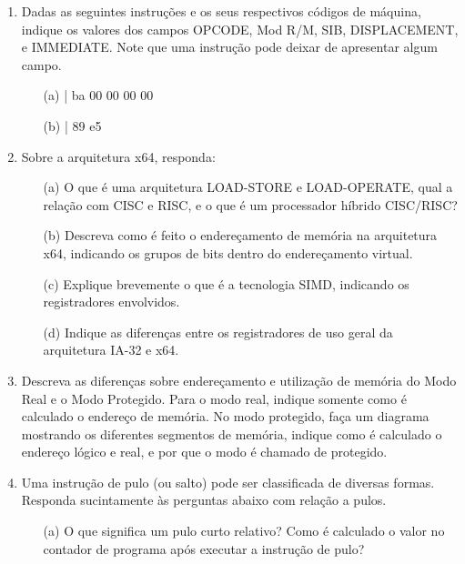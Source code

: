 \begin{enumerate}

    \item 
    Dadas as seguintes instruções e os seus respectivos códigos de máquina,
    indique os valores dos campos OPCODE, Mod R/M, SIB, DISPLACEMENT, e IMMEDIATE.
    Note que uma instrução pode deixar de apresentar algum campo.
    \begin{itemize}
        \item [(a)]  | ba 00 00 00 00
        \item [(b)]  | 89 e5
    \end{itemize}

    \item
    Sobre a arquitetura x64, responda:
    \begin{itemize}
        \item [(a)]
        O que é uma arquitetura LOAD-STORE e LOAD-OPERATE,
        qual a relação com CISC e RISC,
        e o que é um processador híbrido CISC/RISC?

        \item [(b)]
        Descreva como é feito o endereçamento de memória na arquitetura x64,
        indicando os grupos de bits dentro do endereçamento virtual.

        \item [(c)]
        Explique brevemente o que é a tecnologia SIMD,
        indicando os registradores envolvidos.

        \item [(d)]
        Indique as diferenças entre os registradores 
        de uso geral da arquitetura IA-32 e x64.    
    \end{itemize}

    \item
    Descreva as diferenças sobre endereçamento e utilização de memória 
    do Modo Real e o Modo Protegido. 
    Para o modo real, indique somente como é calculado o endereço de memória.
    No modo protegido, 
    faça um diagrama mostrando os diferentes segmentos de memória,
    indique como é calculado o endereço lógico e real, 
    e por que o modo é chamado de protegido.

    \item
    Uma instrução de pulo (ou salto) pode ser classificada de diversas formas.
    Responda sucintamente às perguntas abaixo com relação a pulos.
    \begin{itemize}
        \item [(a)]
        O que significa um pulo curto relativo? 
        Como é calculado o valor no contador de programa 
        após executar a instrução de pulo?


\end{itemize}
\end{enumerate}
